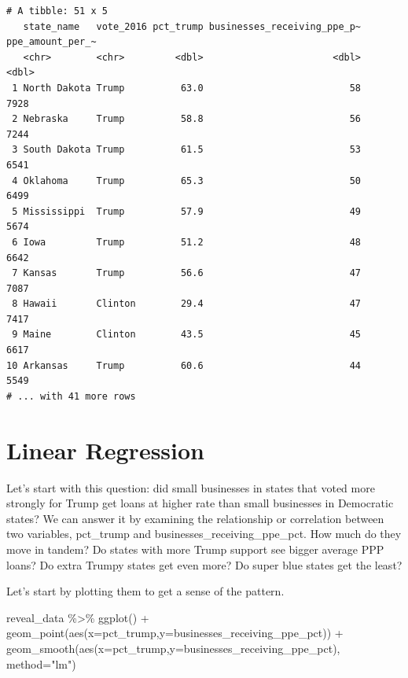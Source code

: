 \documentclass[
  letterpaper,
  DIV=11,
  numbers=noendperiod]{scrreprt}
\newenvironment{Shaded}{\begin{snugshade}}{\end{snugshade}}
\newcommand{\AttributeTok}[1]{\textcolor[rgb]{0.40,0.45,0.13}{#1}}
\newcommand{\FunctionTok}[1]{\textcolor[rgb]{0.28,0.35,0.67}{#1}}
\newcommand{\NormalTok}[1]{\textcolor[rgb]{0.00,0.23,0.31}{#1}}
\newcommand{\SpecialCharTok}[1]{\textcolor[rgb]{0.37,0.37,0.37}{#1}}
\newcommand{\StringTok}[1]{\textcolor[rgb]{0.13,0.47,0.30}{#1}}
\begin{document}
\begin{verbatim}
# A tibble: 51 x 5
   state_name   vote_2016 pct_trump businesses_receiving_ppe_p~ ppe_amount_per_~
   <chr>        <chr>         <dbl>                       <dbl>            <dbl>
 1 North Dakota Trump          63.0                          58             7928
 2 Nebraska     Trump          58.8                          56             7244
 3 South Dakota Trump          61.5                          53             6541
 4 Oklahoma     Trump          65.3                          50             6499
 5 Mississippi  Trump          57.9                          49             5674
 6 Iowa         Trump          51.2                          48             6642
 7 Kansas       Trump          56.6                          47             7087
 8 Hawaii       Clinton        29.4                          47             7417
 9 Maine        Clinton        43.5                          45             6617
10 Arkansas     Trump          60.6                          44             5549
# ... with 41 more rows
\end{verbatim}


\hypertarget{linear-regression}{%
\chapter{Linear Regression}\label{linear-regression}}

Let's start with this question: did small businesses in states that
voted more strongly for Trump get loans at higher rate than small
businesses in Democratic states? We can answer it by examining the
relationship or correlation between two variables, pct\_trump and
businesses\_receiving\_ppe\_pct. How much do they move in tandem? Do
states with more Trump support see bigger average PPP loans? Do extra
Trumpy states get even more? Do super blue states get the least?

Let's start by plotting them to get a sense of the pattern.

\begin{Shaded}
\begin{Highlighting}[]
\NormalTok{reveal\_data }\SpecialCharTok{\%\textgreater{}\%}
  \FunctionTok{ggplot}\NormalTok{() }\SpecialCharTok{+}
  \FunctionTok{geom\_point}\NormalTok{(}\FunctionTok{aes}\NormalTok{(}\AttributeTok{x=}\NormalTok{pct\_trump,}\AttributeTok{y=}\NormalTok{businesses\_receiving\_ppe\_pct)) }\SpecialCharTok{+}
  \FunctionTok{geom\_smooth}\NormalTok{(}\FunctionTok{aes}\NormalTok{(}\AttributeTok{x=}\NormalTok{pct\_trump,}\AttributeTok{y=}\NormalTok{businesses\_receiving\_ppe\_pct), }\AttributeTok{method=}\StringTok{"lm"}\NormalTok{)}
\end{Highlighting}
\end{Shaded}
\end{document}

